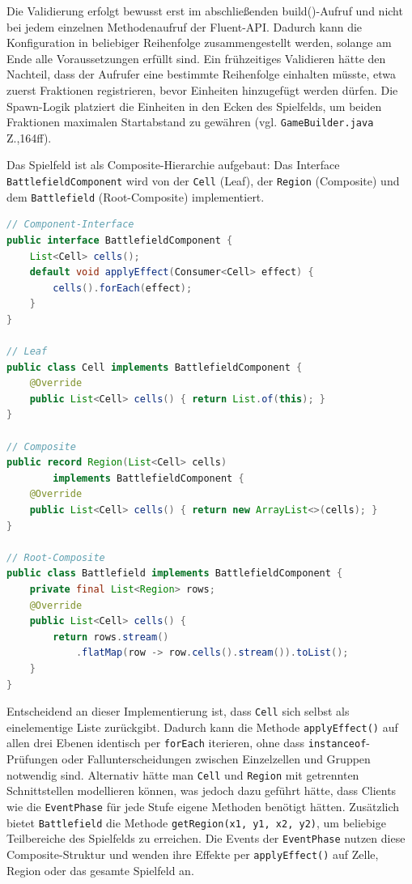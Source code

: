 Die Validierung erfolgt bewusst erst im abschließenden build()-Aufruf und nicht bei jedem einzelnen Methodenaufruf der Fluent-API.
Dadurch kann die Konfiguration in beliebiger Reihenfolge zusammengestellt werden, solange am Ende alle Voraussetzungen erfüllt
sind. Ein frühzeitiges Validieren hätte den Nachteil, dass der Aufrufer eine bestimmte Reihenfolge einhalten müsste, etwa
zuerst Fraktionen registrieren, bevor Einheiten hinzugefügt werden dürfen. Die Spawn-Logik platziert die Einheiten in den
Ecken des Spielfelds, um beiden Fraktionen maximalen Startabstand zu gewähren (vgl. \texttt{GameBuilder.java} Z.,164ff).

Das Spielfeld ist als Composite-Hierarchie aufgebaut: Das Interface \texttt{BattlefieldComponent} wird von der
\texttt{Cell} (Leaf), der \texttt{Region} (Composite) und dem \texttt{Battlefield} (Root-Composite) implementiert.

\begin{lstlisting}[language=Java, caption={Composite-Hierarchie -- Cell, Region und Battlefield}, label={lst:composite-hierarchy}]
// Component-Interface
public interface BattlefieldComponent {
    List<Cell> cells();
    default void applyEffect(Consumer<Cell> effect) {
        cells().forEach(effect);
    }
}

// Leaf
public class Cell implements BattlefieldComponent {
    @Override
    public List<Cell> cells() { return List.of(this); }
}

// Composite
public record Region(List<Cell> cells)
        implements BattlefieldComponent {
    @Override
    public List<Cell> cells() { return new ArrayList<>(cells); }
}

// Root-Composite
public class Battlefield implements BattlefieldComponent {
    private final List<Region> rows;
    @Override
    public List<Cell> cells() {
        return rows.stream()
            .flatMap(row -> row.cells().stream()).toList();
    }
}
\end{lstlisting}

Entscheidend an dieser Implementierung ist, dass \texttt{Cell} sich selbst als einelementige Liste zurückgibt. Dadurch kann die
Methode \texttt{applyEffect()} auf allen drei Ebenen identisch per \texttt{forEach} iterieren, ohne dass \texttt{instanceof}-Prüfungen
oder Fallunterscheidungen zwischen Einzelzellen und Gruppen notwendig sind. Alternativ hätte man \texttt{Cell} und \texttt{Region}
mit getrennten Schnittstellen modellieren können, was jedoch dazu geführt hätte, dass Clients wie die \texttt{EventPhase}
für jede Stufe eigene Methoden benötigt hätten. Zusätzlich bietet \texttt{Battlefield} die Methode \texttt{getRegion(x1, y1, x2, y2)},
um beliebige Teilbereiche des Spielfelds zu erreichen. Die Events der \texttt{EventPhase} nutzen diese Composite-Struktur
und wenden ihre Effekte per \texttt{applyEffect()} auf Zelle, Region oder das gesamte Spielfeld an.


